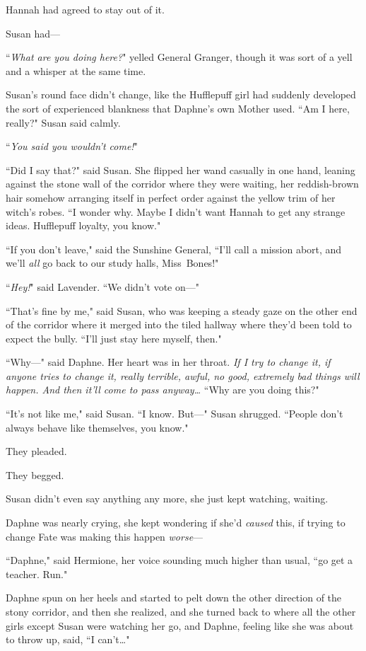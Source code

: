 Hannah had agreed to stay out of it.

Susan had—

\later

``\emph{What are you doing here?}" yelled General Granger, though it was sort of a yell and a whisper at the same time.

Susan's round face didn't change, like the Hufflepuff girl had suddenly developed the sort of experienced blankness that Daphne's own Mother used. ``Am I here, really?" Susan said calmly.

``\emph{You said you wouldn't come!}"

``Did I say that?" said Susan. She flipped her wand casually in one hand, leaning against the stone wall of the corridor where they were waiting, her reddish-brown hair somehow arranging itself in perfect order against the yellow trim of her witch's robes. ``I wonder why. Maybe I didn't want Hannah to get any strange ideas. Hufflepuff loyalty, you know."

``If you don't leave," said the Sunshine General, ``I'll call a mission abort, and we'll \emph{all} go back to our study halls, Miss~Bones!"

``\emph{Hey!}" said Lavender. ``We didn't vote on—"

``That's fine by me," said Susan, who was keeping a steady gaze on the other end of the corridor where it merged into the tiled hallway where they'd been told to expect the bully. ``I'll just stay here myself, then."

``Why—" said Daphne. Her heart was in her throat. \emph{If I try to change it, if \emph{anyone} tries to change it, really terrible, awful, no good, extremely bad things will happen. And then it'll come to pass anyway{\ldots}} ``Why are you doing this?"

``It's not like me," said Susan. ``I know. But—" Susan shrugged. ``People don't always behave like themselves, you know."

They pleaded.

They begged.

Susan didn't even say anything any more, she just kept watching, waiting.

Daphne was nearly crying, she kept wondering if she'd \emph{caused} this, if trying to change Fate was making this happen \emph{worse}—

``Daphne," said Hermione, her voice sounding much higher than usual, ``go get a teacher. Run."

Daphne spun on her heels and started to pelt down the other direction of the stony corridor, and then she realized, and she turned back to where all the other girls except Susan were watching her go, and Daphne, feeling like she was about to throw up, said, ``I can't{\ldots}"

